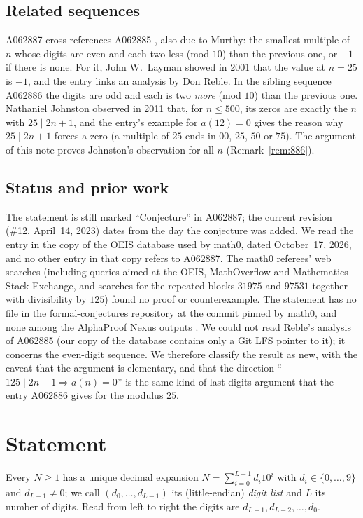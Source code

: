 \documentclass[11pt]{amsart}
\theoremstyle{plain}
\theoremstyle{definition}
\begin{document}
\subsection*{Related sequences}
A062887 cross-references A062885 \cite{A062885}, also due to Murthy: the smallest multiple of $n$ whose digits are even and each two less (mod $10$) than the previous one, or $-1$ if there is none. For it, John W.~Layman showed in 2001 that the value at $n=25$ is $-1$, and the entry links an analysis by Don Reble.
In the sibling sequence A062886 \cite{A062886} the digits are odd and each is two \emph{more} (mod $10$) than the previous one. Nathaniel Johnston observed in 2011 that, for $n\le500$, its zeros are exactly the $n$ with $25\mid 2n+1$, and the entry's example for $a(12)=0$ gives the reason why $25\mid 2n+1$ forces a zero (a multiple of $25$ ends in $00$, $25$, $50$ or $75$). The argument of this note proves Johnston's observation for all $n$ (Remark~\ref{rem:886}).

\subsection*{Status and prior work}
The statement is still marked ``Conjecture'' in A062887; the current revision (\#12, April~14, 2023) dates from the day the conjecture was added. We read the entry in the copy of the OEIS database used by math0, dated October~17, 2026, and no other entry in that copy refers to A062887.
The math0 referees' web searches (including queries aimed at the OEIS, MathOverflow and Mathematics Stack Exchange, and searches for the repeated blocks $31975$ and $97531$ together with divisibility by $125$) found no proof or counterexample.
The statement has no file in the formal-conjectures repository \cite{FC} at the commit pinned by math0, and none among the AlphaProof Nexus outputs \cite{APN}.
We could not read Reble's analysis of A062885 (our copy of the database contains only a Git LFS pointer to it); it concerns the even-digit sequence.
We therefore classify the result as new, with the caveat that the argument is elementary, and that the direction ``$125\mid 2n+1\Rightarrow a(n)=0$'' is the same kind of last-digits argument that the entry A062886 gives for the modulus $25$.

\section{Statement}\label{sec:statement}

Every $N\ge1$ has a unique decimal expansion $N=\sum_{i=0}^{L-1}d_i10^i$ with $d_i\in\{0,\dots,9\}$ and $d_{L-1}\ne0$; we call $(d_0,\dots,d_{L-1})$ its (little-endian) \emph{digit list} and $L$ its number of digits. Read from left to right the digits are $d_{L-1},d_{L-2},\dots,d_0$.
\end{document}
